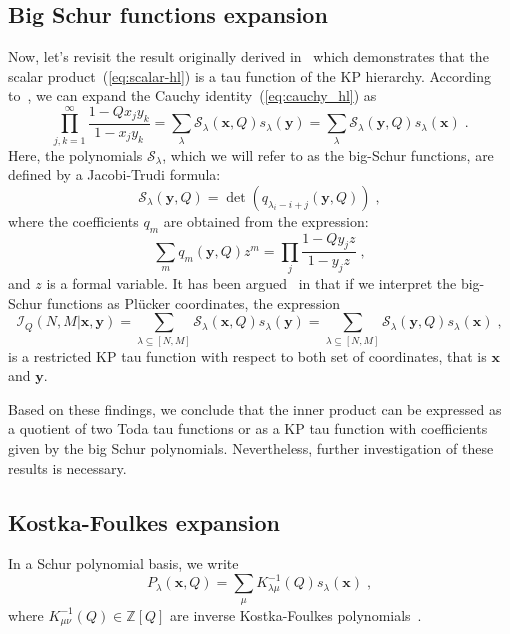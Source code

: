 \documentclass[a4paper,11pt]{amsart}
\begin{document}
\subsection{Big Schur functions expansion}
Now, let's revisit the result originally derived in~\cite{Foda:2008hn}
which demonstrates that the scalar product~(\ref{eq:scalar-hl}) is a
tau function of the KP hierarchy. According to~\cite[Chapter 3,
  Section 4, Equation (4.7)]{Macdonald:1998}, we can expand the Cauchy
identity~(\ref{eq:cauchy_hl}) as
\begin{equation}
 \prod_{j, k=1}^\infty \frac{1-Q x_j y_k}{1 - x_j y_k} = 
\sum_{\lambda} \mathcal{S}_{\lambda}(\bm{x}, Q) s_{\lambda}(\bm{y}) =
\sum_{\lambda} \mathcal{S}_{\lambda}(\bm{y}, Q) s_{\lambda}(\bm{x}) \; .
\end{equation}
Here, the polynomials \(\mathcal{S}_\lambda\), which we will refer to as
the big-Schur functions, are defined by a Jacobi-Trudi formula:
\begin{equation}
  \mathcal{S}_{\lambda} (\bm{y}, Q) = \det(q_{\lambda_i -i + j}(\bm{y}, Q))\; , 
\end{equation}
where the coefficients \(q_m\) are obtained from the expression:
\begin{equation}
 \sum_{m} q_m(\bm{y}, Q) z^m =
 \prod_{j} \frac{1-Q y_j z}{1 - y_j z}\; ,
\end{equation}
and \(z\) is a formal variable. It has been
argued~\cite{Foda:2008hn} in that if we interpret the big-Schur
functions as Plücker coordinates, the expression
\begin{equation}
\label{eq:big-expansion}
  \mathcal{I}_Q(N,M | \bm{x}, \bm{y})
  = \sum_{\lambda \subseteq [N,M]} \mathcal{S}_{\lambda}(\bm{x}, Q) s_{\lambda}(\bm{y})
  = \sum_{\lambda \subseteq [N,M]} \mathcal{S}_{\lambda}(\bm{y}, Q) s_{\lambda}(\bm{x})\; ,
\end{equation}
is a restricted KP tau function with respect to both set of coordinates,
that is \(\bm{x}\) and \(\bm{y}\).

Based on these findings, we conclude that the inner product can be
expressed as a quotient of two Toda tau functions or as a KP tau
function with coefficients given by the big Schur polynomials.
Nevertheless, further investigation of these results is necessary.


\subsection{Kostka-Foulkes expansion}
In a Schur polynomial basis, we write
\begin{equation}
P_\lambda(\bm{x}, Q) = \sum_{\mu} K^{-1}_{\lambda \mu}(Q) s_\lambda(\bm{x})\; , 
\end{equation}
where \(K^{-1}_{\mu\nu}(Q) \in \mathbb{Z}[Q]\) are inverse
Kostka-Foulkes polynomials~\cite{Macdonald:1998, Wheeler:2018}.
\end{document}
